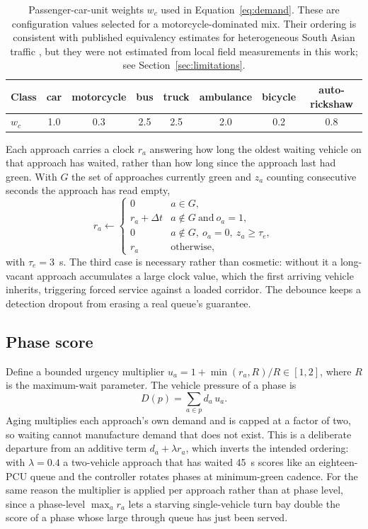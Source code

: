 \documentclass[journal]{IEEEtran}
\newcommand{\pcu}{PCU}
\begin{document}
\begin{table}[t]
\centering
\caption{Passenger-car-unit weights $w_c$ used in Equation~\eqref{eq:demand}. These are
configuration values selected for a motorcycle-dominated mix. Their ordering is consistent with
published equivalency estimates for heterogeneous South Asian traffic
\cite{chandra2003effect,arasan2010microsimulation,kumar2018new}, but they were not estimated from
local field measurements in this work; see Section~\ref{sec:limitations}.}
\label{tab:pcu}
\small
\begin{tabular}{lccccccc}
\toprule
Class & car & motorcycle & bus & truck & ambulance & bicycle & auto-rickshaw \\
\midrule
$w_c$ & 1.0 & 0.3 & 2.5 & 2.5 & 2.0 & 0.2 & 0.8 \\
\bottomrule
\end{tabular}
\end{table}

Each approach carries a clock $r_a$ answering how long the oldest waiting vehicle on that approach
has waited, rather than how long since the approach last had green. With $G$ the set of approaches
currently green and $z_a$ counting consecutive seconds the approach has read empty,
\begin{equation}
r_a \leftarrow
\begin{cases}
0 & a \in G,\\[2pt]
r_a + \Delta t & a \notin G \ \text{and}\ o_a = 1,\\[2pt]
0 & a \notin G,\ o_a = 0,\ z_a \geq \tau_e,\\[2pt]
r_a & \text{otherwise},
\end{cases}
\label{eq:wait}
\end{equation}
with $\tau_e = 3$~s. The third case is necessary rather than cosmetic: without it a long-vacant
approach accumulates a large clock value, which the first arriving vehicle inherits, triggering forced
service against a loaded corridor. The debounce keeps a detection dropout from erasing a real queue's
guarantee.

\subsection{Phase score}

Define a bounded urgency multiplier $u_a = 1 + \min(r_a, R)/R \in [1,2]$, where $R$ is the
maximum-wait parameter. The vehicle pressure of a phase is
\begin{equation}
D(p) = \sum_{a \in p} d_a \, u_a .
\label{eq:vehpressure}
\end{equation}
Aging multiplies each approach's own demand and is capped at a factor of two, so waiting cannot
manufacture demand that does not exist. This is a deliberate departure from an additive term
$d_a + \lambda r_a$, which inverts the intended ordering: with $\lambda = 0.4$ a two-vehicle approach
that has waited 45~s scores like an eighteen-\pcu{} queue and the controller rotates phases at
minimum-green cadence. For the same reason the multiplier is applied per approach rather than at phase
level, since a phase-level $\max_a r_a$ lets a starving single-vehicle turn bay double the score of a
phase whose large through queue has just been served.
\end{document}
